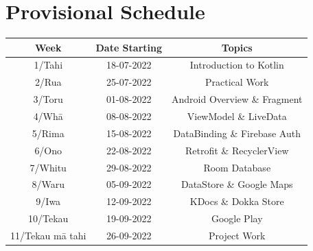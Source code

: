 \documentclass{article}
\begin{document}
\section*{Provisional Schedule}
\renewcommand{\arraystretch}{1.5}
\begin{tabular}{|c|c|c|c|}
	\hline
	\textbf{Week}                  & \textbf{Date Starting}            & \multicolumn{2}{c|}{\textbf{Topics}}                                                                                             \\ \hline
	\footnotesize 1/Tahi           & \footnotesize 18-07-2022 & \multicolumn{2}{c|}{\footnotesize Introduction to Kotlin}    \\ \hline
	\footnotesize 2/Rua            & \footnotesize 25-07-2022 & \multicolumn{2}{c|}{\footnotesize Practical Work}                   \\ \hline
	\footnotesize 3/Toru           & \footnotesize 01-08-2022 & \multicolumn{2}{c|}{\footnotesize Android Overview \& Fragment} \\ \hline
	\footnotesize 4/Whā            & \footnotesize 08-08-2022 & \multicolumn{2}{c|}{\footnotesize ViewModel \& LiveData}                               \\ \hline
	\footnotesize 5/Rima           & \footnotesize 15-08-2022 & \multicolumn{2}{c|}{\footnotesize DataBinding \& Firebase Auth}                                                \\ \hline
	\footnotesize 6/Ono            & \footnotesize 22-08-2022 &  \multicolumn{2}{c|}{\footnotesize Retrofit \& RecyclerView}                            \\ \hline
	\footnotesize 7/Whitu          & \footnotesize 29-08-2022 & \multicolumn{2}{c|}{\footnotesize Room Database}                                                   \\ \hline
	\footnotesize 8/Waru           & \footnotesize 05-09-2022 & \multicolumn{2}{c|}{\footnotesize DataStore \& Google Maps}                                                   \\ \hline
	\footnotesize 9/Iwa            & \footnotesize 12-09-2022 & \multicolumn{2}{c|}{\footnotesize KDocs \& Dokka Store}                                                                 \\ \hline
	\footnotesize 10/Tekau         & \footnotesize 19-09-2022 & \multicolumn{2}{c|}{\footnotesize Google Play}                                                                 \\ \hline
	\footnotesize 11/Tekau mā tahi & \footnotesize 26-09-2022 & \multicolumn{2}{c|}{\footnotesize Project Work}                                                                 \\ \hline

\end{tabular}
\end{document}
